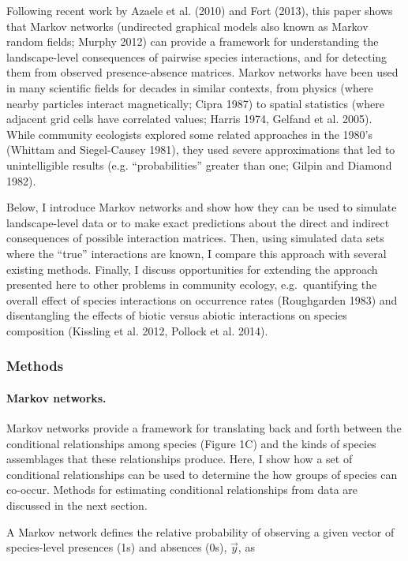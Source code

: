 \documentclass[12pt,]{article}
\begin{document}
\begin{spacing}{1.9}
\begin{flushleft}
Following recent work by Azaele et al. (2010) and Fort (2013), this
paper shows that Markov networks (undirected graphical models also known
as Markov random fields; Murphy 2012) can provide a framework for
understanding the landscape-level consequences of pairwise species
interactions, and for detecting them from observed presence-absence
matrices. Markov networks have been used in many scientific fields for
decades in similar contexts, from physics (where nearby particles
interact magnetically; Cipra 1987) to spatial statistics (where adjacent
grid cells have correlated values; Harris 1974, Gelfand et al. 2005).
While community ecologists explored some related approaches in the
1980's (Whittam and Siegel-Causey 1981), they used severe approximations
that led to unintelligible results (e.g. ``probabilities'' greater than
one; Gilpin and Diamond 1982).

Below, I introduce Markov networks and show how they can be used to
simulate landscape-level data or to make exact predictions about the
direct and indirect consequences of possible interaction matrices. Then,
using simulated data sets where the ``true'' interactions are known, I
compare this approach with several existing methods. Finally, I discuss
opportunities for extending the approach presented here to other
problems in community ecology, e.g.~quantifying the overall effect of
species interactions on occurrence rates (Roughgarden 1983) and
disentangling the effects of biotic versus abiotic interactions on
species composition (Kissling et al. 2012, Pollock et al. 2014).

\subsubsection{Methods}\label{methods}

\paragraph{Markov networks.}\label{markov-networks.}

Markov networks provide a framework for translating back and forth
between the conditional relationships among species (Figure 1C) and the
kinds of species assemblages that these relationships produce. Here, I
show how a set of conditional relationships can be used to determine the
how groups of species can co-occur. Methods for estimating conditional
relationships from data are discussed in the next section.

A Markov network defines the relative probability of observing a given
vector of species-level presences (1s) and absences (0s), \(\vec{y}\),
as


\end{flushleft}
\end{spacing}
\end{document}
